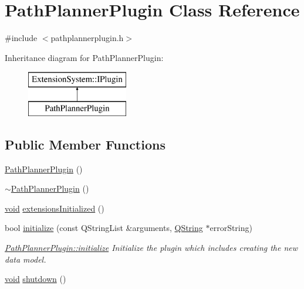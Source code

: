\hypertarget{class_path_planner_plugin}{\section{\-Path\-Planner\-Plugin \-Class \-Reference}
\label{class_path_planner_plugin}
}


{\ttfamily \#include $<$pathplannerplugin.\-h$>$}

\-Inheritance diagram for \-Path\-Planner\-Plugin\-:\begin{figure}[H]
\begin{center}
\leavevmode
\includegraphics[height=2.000000cm]{class_path_planner_plugin}
\end{center}
\end{figure}
\subsection*{\-Public \-Member \-Functions}
\begin{DoxyCompactItemize}
\item 
\hyperlink{group___path_planner_gadget_plugin_ga754f3760ad2179865dabf983f1bcfb04}{\-Path\-Planner\-Plugin} ()
\item 
\hyperlink{group___path_planner_gadget_plugin_gabb5e520f0952f6c023ae86b5bb903197}{$\sim$\-Path\-Planner\-Plugin} ()
\item 
\hyperlink{group___u_a_v_objects_plugin_ga444cf2ff3f0ecbe028adce838d373f5c}{void} \hyperlink{group___path_planner_gadget_plugin_ga21fa3c1e21372d56ddf70b6fe5973897}{extensions\-Initialized} ()
\item 
bool \hyperlink{group___path_planner_gadget_plugin_ga08ada1f91b2f37c282cbabdcdb7af6d8}{initialize} (const \-Q\-String\-List \&arguments, \hyperlink{group___u_a_v_objects_plugin_gab9d252f49c333c94a72f97ce3105a32d}{\-Q\-String} $\ast$error\-String)
\begin{DoxyCompactList}\small\item\em \hyperlink{group___path_planner_gadget_plugin_ga08ada1f91b2f37c282cbabdcdb7af6d8}{\-Path\-Planner\-Plugin\-::initialize} \-Initialize the plugin which includes creating the new data model. \end{DoxyCompactList}\item 
\hyperlink{group___u_a_v_objects_plugin_ga444cf2ff3f0ecbe028adce838d373f5c}{void} \hyperlink{group___path_planner_gadget_plugin_ga86bbf998d72f805f00576608baf627ba}{shutdown} ()
\end{DoxyCompactItemize}


